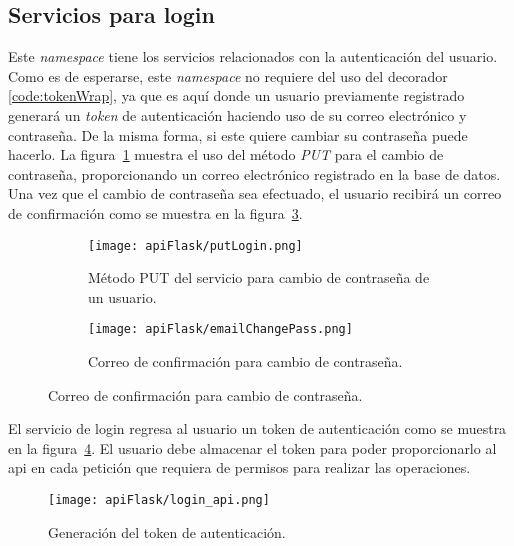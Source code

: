 \subsection{Servicios para login}

Este \textit{namespace} tiene los servicios relacionados con la autenticación del usuario. Como es de esperarse, este \textit{namespace} no requiere del uso del decorador \ref{code:tokenWrap}, ya que es aquí donde un usuario previamente registrado generará un \textit{token} de autenticación haciendo uso de su correo electrónico y contraseña. De la misma forma, si este quiere cambiar su contraseña puede hacerlo. La figura~\ref{img:putLogin} muestra el uso del método \textit{PUT} para el cambio de contraseña, proporcionando un correo electrónico registrado en la base de datos. Una vez que el cambio de contraseña sea efectuado, el usuario recibirá un correo de confirmación como se muestra en la figura~\ref{img:changePass}.

\begin{figure}[H]
  \begin{subfigure}[b]{0.5\textwidth}
      \texttt{[image: apiFlask/putLogin.png]}
      \caption{Método PUT del servicio para cambio de contraseña de un usuario.}
      \label{img:putLogin}
    \end{subfigure}
    \hfill
    \begin{subfigure}[b]{0.5\textwidth}
      \texttt{[image: apiFlask/emailChangePass.png]}
      \caption{Correo de confirmación para cambio de contraseña.}
      \label{img:changePass}
    \end{subfigure}
\end{figure}

El servicio de login regresa al usuario un token de autenticación como se muestra en la figura~\ref{img:loginApi}. El usuario debe almacenar el token para poder proporcionarlo al api en cada petición que requiera de permisos para realizar las operaciones.


\begin{figure}[H]
  \centering
  \texttt{[image: apiFlask/login\_api.png]}
  \caption{Generación del token de autenticación.}
  \label{img:loginApi}
\end{figure}